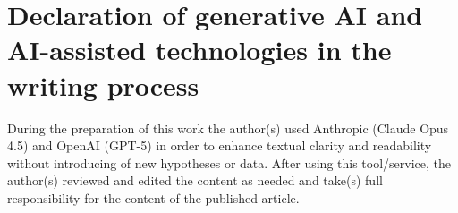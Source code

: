 \section*{Declaration of generative AI and AI-assisted technologies in the writing process}

During the preparation of this work the author(s) used Anthropic (Claude Opus 4.5) and OpenAI (GPT-5) in order to enhance textual clarity and readability without introducing of new hypotheses or data. After using this tool/service, the author(s) reviewed and edited the content as needed and take(s) full responsibility for the content of the published article.